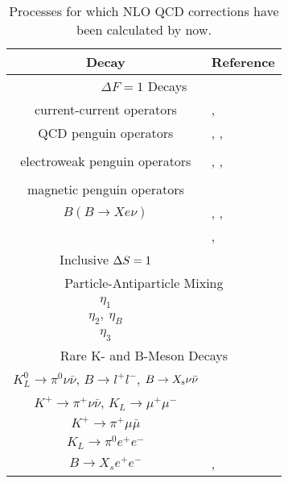 \begin{table}[htb]
\caption[]{Processes for which NLO QCD corrections have been calculated by
now.
\label{tab:processes}}
\begin{center}
\begin{tabular}{|cl|}
\bf Decay & \bf \phantom{XXXXXX} Reference \\
\hline
\hline
 \multicolumn{2}{|c|}{$\Delta F=1$ Decays} \\
\hline
current-current operators     & \cite{altarelli:81}, \cite{burasweisz:90} \\
QCD penguin operators         & \cite{burasetal:92b}, \cite{burasetal:92c}, \\
                              & \cite{ciuchini:93} \\
electroweak penguin operators & \cite{burasetal:92b}, \cite{burasetal:92c}, \\
                              & \cite{ciuchini:93} \\
magnetic penguin operators    & \cite{misiakmuenz:95} \\
$B(B \to X e\nu)$             & \cite{altarelli:81}, \cite{buchalla:93}, \\
                              & \cite{baganetal:94a}, \cite{baganetal:95} \\
Inclusive $\Delta S=1$               & \cite{jaminpich:94} \\
\hline
\multicolumn{2}{|c|}{Particle-Antiparticle Mixing} \\
\hline
$\eta_1$                   & \cite{herrlichnierste:93} \\
$\eta_2,~\eta_B$           & \cite{burasjaminweisz:90} \\
$\eta_3$                   & \cite{herrlichnierste:95} \\
\hline
\multicolumn{2}{|c|}{Rare K- and B-Meson Decays} \\
\hline
$K^0_L \rightarrow \pi^0\nu\bar{\nu}$, $B \rightarrow l^+l^-$,
$B \rightarrow X_{\rm s}\nu\bar{\nu}$ & \cite{buchallaburas:93b} \\
$K^+   \rightarrow \pi^+\nu\bar{\nu}$, $K_L \rightarrow \mu^+\mu^-$
                                      & \cite{buchallaburas:94} \\
$K^+\to\pi^+\mu\bar\mu$               & \cite{buchallaburas:94b} \\
$K_L \rightarrow \pi^0e^+e^-$         & \cite{burasetal:94a} \\
$B\rightarrow X_s e^+e^-$           & \cite{misiak:94}, \cite{burasmuenz:95} \\
\end{tabular}
\end{center}
\end{table}

